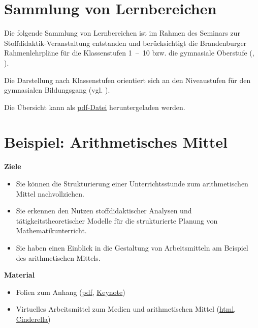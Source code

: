 \documentclass[
]{scrbook}
\providecommand{\tightlist}{%
  \setlength{\itemsep}{0pt}\setlength{\parskip}{0pt}}
\renewenvironment{quote}{
  \list{}{
	\leftmargin0.2cm   %
    \rightmargin\leftmargin
      	\def\FrameCommand
    {%
        {\color{quoteColor}\vrule width 2pt}%
        \hspace{0pt}%
    }%
    \MakeFramed{\advance \hsize -\width \FrameRestore}    \color{quoteColor}
    }
  \item\relax
}
{\endlist\color{black}\endMakeFramed}
\theoremstyle{definition}
\theoremstyle{definition}
\theoremstyle{definition}
\theoremstyle{definition}
\theoremstyle{remark}
\begin{document}
\appendix


\chapter{Sammlung von Lernbereichen}\label{sammlung-von-lernbereichen}

Die folgende Sammlung von Lernbereichen ist im Rahmen des Seminars zur Stoffdidaktik-Veranstaltung entstanden und berücksichtigt die Brandenburger Rahmenlehrpläne für die Klassenstufen 1~--~10 bzw. die gymnasiale Oberstufe (, ).

Die Darstellung nach Klassenstufen orientiert sich an den Niveaustufen für den gymnasialen Bildungsgang (vgl. ).

Die Übersicht kann als \href{files/Stoffdidaktik2024-SammlungLernbereiche.pdf}{pdf-Datei} heruntergeladen werden.

\chapter{Beispiel: Arithmetisches Mittel}\label{beispiel-arithmetisches-mittel}

\begin{quote}
\textbf{Ziele}

\begin{itemize}
\tightlist
\item
  Sie können die Strukturierung einer Unterrichtsstunde zum arithmetischen Mittel nachvollziehen.\\
\item
  Sie erkennen den Nutzen stoffdidaktischer Analysen und tätigkeitstheoretischer Modelle für die strukturierte Planung von Mathematikunterricht.\\
\item
  Sie haben einen Einblick in die Gestaltung von Arbeitsmitteln am
  Beispiel des arithmetischen Mittels.
\end{itemize}

\textbf{Material}

\begin{itemize}
\tightlist
\item
  Folien zum Anhang (\href{files/Stoffdidaktik2024-B-ArithmetischesMittel.pdf}{pdf}, \href{files/Stoffdidaktik2024-B-ArithmetischesMittel.key}{Keynote})
\item
  Virtuelles Arbeitsmittel zum Medien und arithmetischen Mittel (\href{files/Stoffdidaktik2024-B-Lagemasse.html}{html}, \href{files/Stoffdidaktik2024-B-Lagemasse.cdy}{Cinderella})
\end{itemize}
\end{quote}
\end{document}
